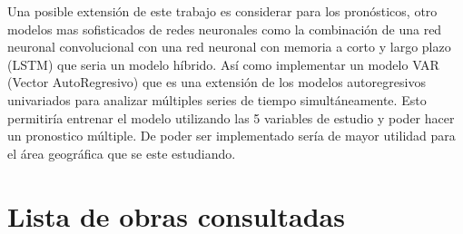 \documentclass[
  us-letterpaper,
]{scrreprt}
\theoremstyle{plain}
\theoremstyle{definition}
\theoremstyle{definition}
\theoremstyle{remark}
\begin{document}
Una posible extensión de este trabajo es considerar para los
pronósticos, otro modelos mas sofisticados de redes neuronales como la
combinación de una red neuronal convolucional con una red neuronal con
memoria a corto y largo plazo (LSTM) que seria un modelo híbrido. Así
como implementar un modelo VAR (Vector AutoRegresivo) que es una
extensión de los modelos autoregresivos univariados para analizar
múltiples series de tiempo simultáneamente. Esto permitiría entrenar el
modelo utilizando las 5 variables de estudio y poder hacer un pronostico
múltiple. De poder ser implementado sería de mayor utilidad para el área
geográfica que se este estudiando.


\chapter*{Lista de obras consultadas}\label{lista-de-obras-consultadas}


\printbibliography[heading=none]
\end{document}
